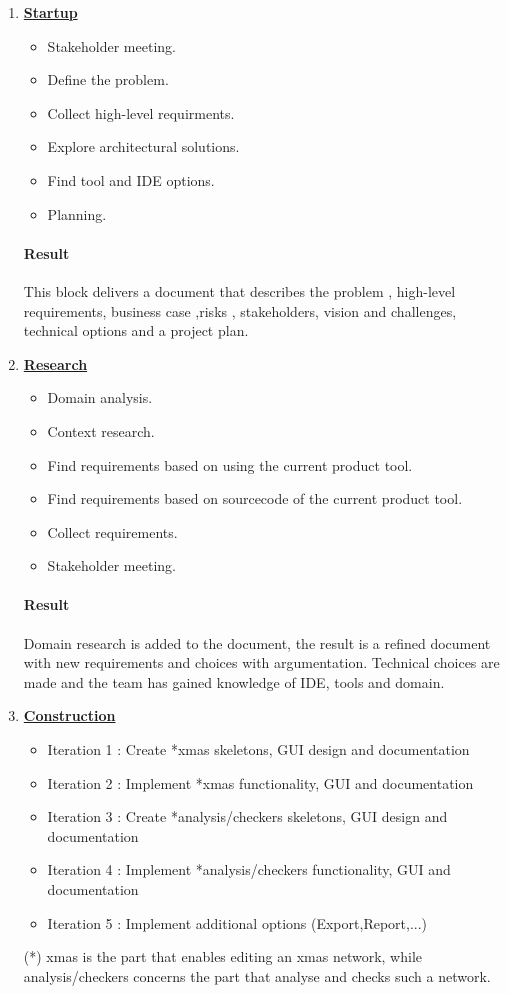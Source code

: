 \begin{enumerate}
	\item \underline{\textbf{Startup}}
	\begin{itemize}
		\item Stakeholder meeting.
		\item Define the problem.
		\item Collect high-level requirments.
		\item Explore architectural solutions.
		\item Find tool and IDE options.
		\item Planning. 
	\end{itemize}
	\paragraph{Result}
	This block delivers a document that describes the problem , high-level requirements, business case ,risks , stakeholders, vision and challenges, technical options and a project plan.
	
	\item \underline{\textbf{Research}}
	\begin{itemize}
		\item Domain analysis.
		\item Context research.
		\item Find requirements based on using the current product tool.
		\item Find requirements based on sourcecode of the current product tool.
		\item Collect requirements.
		\item Stakeholder meeting.
	\end{itemize}
	\paragraph{Result}
	Domain research is added to the document, the result is a refined document with new requirements and choices with argumentation. Technical choices are made and the team has gained knowledge of IDE, tools and domain. 
	
	\item \underline{\textbf{Construction}}
	
	\begin{itemize}
		\item Iteration 1 :
		Create *xmas skeletons, GUI design and documentation
		\item Iteration 2 :
		Implement *xmas functionality, GUI and documentation
		\item Iteration 3 :
		Create *analysis/checkers skeletons, GUI design and documentation
		\item Iteration 4 :
		Implement *analysis/checkers functionality, GUI and documentation
		\item Iteration 5 :
		Implement additional options (Export,Report,...)
	\end{itemize}
	(*) xmas is the part that enables editing an xmas network, while analysis/checkers concerns the part that analyse and checks such a network.
	

\end{enumerate}
